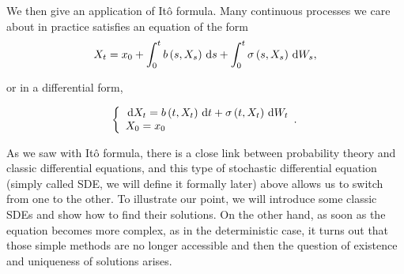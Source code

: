 We then give an application of Itô formula. Many continuous processes we care about in practice satisfies an equation of the form
	$$
	X_{t}=x_{0}+\int_{0}^{t} b\left(s, X_{s}\right) \,\mathrm{d} s+\int_{0}^{t} \sigma\left(s, X_{s}\right) \,\mathrm{d} W_{s},
	$$

	or in a differential form,

	$$
	\left\{\begin{array}{l}
	{\,\mathrm{d}X_{t}=b\left(t, X_{t}\right) \,\mathrm{d}t+\sigma\left(t, X_{t}\right) \,\mathrm{d}W_{t}} \\
	{X_{0}=x_{0}}
	\end{array}.\right.
	$$

	As we saw with Itô formula, there is a close link between probability theory and classic differential equations, and this type of stochastic differential equation (simply called SDE, we will define it formally later) above allows us to switch from one to the other. To illustrate our point, we will introduce some classic SDEs and show how to find their solutions. On the other hand, as soon as the equation becomes more complex, as in the deterministic case, it turns out that those simple methods are no longer accessible and then the question of existence and uniqueness of solutions arises.

